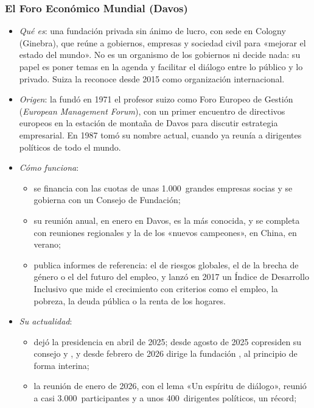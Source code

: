 \documentclass[11pt]{article}
\begin{document}
\subsubsection{El Foro Económico Mundial (Davos)}\label{sec:davos}

\begin{itemize}
\item \emph{Qué es}: una fundación privada sin ánimo de lucro, con sede en Cologny (Ginebra), que reúne a gobiernos, empresas y sociedad civil para «mejorar el estado del mundo». No es un organismo de los gobiernos ni decide nada: su papel es poner temas en la agenda y facilitar el diálogo entre lo público y lo privado. Suiza la reconoce desde 2015 como organización internacional\nocite{Suiza2015WEF}.
\item \emph{Origen}: la fundó en 1971 el profesor suizo  como Foro Europeo de Gestión (\emph{European Management Forum}), con un primer encuentro de directivos europeos en la estación de montaña de Davos para discutir estrategia empresarial. En 1987 tomó su nombre actual, cuando ya reunía a dirigentes políticos de todo el mundo\nocite{WEF2010Historia}.
\item \emph{Cómo funciona}:
  \begin{itemize}
  \item se financia con las cuotas de unas 1.000~grandes empresas socias y se gobierna con un Consejo de Fundación;
  \item su reunión anual, en enero en Davos, es la más conocida, y se completa con reuniones regionales y la de los «nuevos campeones», en China, en verano;
  \item publica informes de referencia: el de riesgos globales, el de la brecha de género o el del futuro del empleo, y lanzó en 2017 un Índice de Desarrollo Inclusivo que mide el crecimiento con criterios como el empleo, la pobreza, la deuda pública o la renta de los hogares\nocite{WEF2018Inclusivo}.
  \end{itemize}
\item \emph{Su actualidad}:
  \begin{itemize}
  \item {} dejó la presidencia en abril de 2025\nocite{WEF2025Gobernanza}; desde agosto de 2025 copresiden su consejo  y , y desde febrero de 2026 dirige la fundación , al principio de forma interina\nocite{WEF2026Copresidentes};
  \item la reunión de enero de 2026, con el lema «Un espíritu de diálogo», reunió a casi 3.000~participantes y a unos 400~dirigentes políticos, un récord\nocite{WEF2026Davos};

\end{itemize}
\end{itemize}
\end{document}
